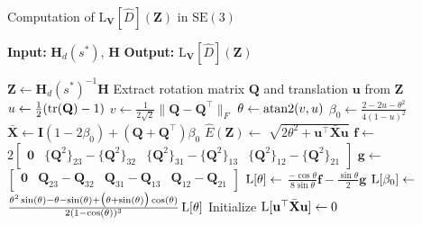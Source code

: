 \begin{algorithm}[H]
    \caption{Computation of $\text{L}_\mathbf{V}[\widehat{D}](\mathbf{Z})$ in $\text{SE}(3)$}
    \label{alg:LN-SE3}
    \begin{algorithmic}[1]
    \Statex \textbf{Input:} $\mathbf{H}_d(s^*)$, $\mathbf{H}$
    \Statex \textbf{Output:} $\text{L}_\mathbf{V}[\widehat{D}](\mathbf{Z})$ 
    
    \State $\mathbf{Z} \gets \mathbf{H}_d(s^*)^{-1} \mathbf{H}$
    \State Extract rotation matrix $\mathbf{Q}$ and translation $\mathbf{u}$ from $\mathbf{Z}$
    \State $u \gets \frac{1}{2} (\operatorname{tr}(\mathbf{Q}) - 1)$
    \State $v \gets \frac{1}{2\sqrt{2}} \|\mathbf{Q} - \mathbf{Q}^\top\|_F$
    \State $\theta \gets \operatorname{atan2}(v, u)$
    \State $\beta_0 \gets \frac{2 - 2u - \theta^2}{4(1 - u)^2}$
    \State $\bar{\mathbf{X}} \gets \mathbf{I}(1 - 2\beta_0) + (\mathbf{Q} + \mathbf{Q}^\top)\beta_0$
    \State $\widehat{E}(\mathbf{Z}) \gets$  $\sqrt{2\theta^2 + \mathbf{u}^\top\bar{\mathbf{X}}\mathbf{u}}$
    \State $\mathbf{f} \gets$ $2\begin{bmatrix}
        \mathbf{0}& \{\mathbf{Q}^2\}_{23}-\{\mathbf{Q}^2\}_{32} & \{\mathbf{Q}^2\}_{31} - \{\mathbf{Q}^2\}_{13} & \{\mathbf{Q}^2\}_{12}-\{\mathbf{Q}^2\}_{21}
    \end{bmatrix}$
    \State $\mathbf{g} \gets$ $\begin{bmatrix}
        \mathbf{0}& \mathbf{Q}_{23}-\mathbf{Q}_{32} & \mathbf{Q}_{31} - \mathbf{Q}_{13} & \mathbf{Q}_{12}-\mathbf{Q}_{21}
    \end{bmatrix}$
    \State $\operatorname{L}[\theta] \gets$ $\frac{-\cos\theta}{8\sin\theta}\mathbf{f} - \frac{\sin\theta}{2}\mathbf{g}$
    \State $\operatorname{L}[\beta_0] \gets$ $\frac{\theta^2\sin(\theta) - \theta - \sin(\theta) + \bigl(\theta + \sin(\theta)\bigr) \cos(\theta)}{2 (1 - \cos(\theta))^3} \operatorname{L}[\theta]$
    \State Initialize $\operatorname{L}[\mathbf{u}^\top \bar{\mathbf{X}} \mathbf{u}] \gets 0$ 


\end{algorithmic}
\end{algorithm}
